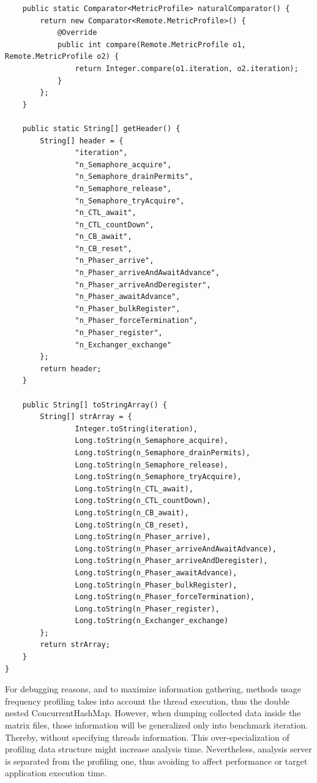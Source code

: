 \documentclass[]{usiinfthesis}
\begin{document}
\begin{verbatim}
    public static Comparator<MetricProfile> naturalComparator() {
        return new Comparator<Remote.MetricProfile>() {
            @Override
            public int compare(Remote.MetricProfile o1, Remote.MetricProfile o2) {
                return Integer.compare(o1.iteration, o2.iteration);
            }
        };
    }

    public static String[] getHeader() {
        String[] header = {
                "iteration",
                "n_Semaphore_acquire",
                "n_Semaphore_drainPermits",
                "n_Semaphore_release",
                "n_Semaphore_tryAcquire",
                "n_CTL_await",
                "n_CTL_countDown",
                "n_CB_await",
                "n_CB_reset",
                "n_Phaser_arrive",
                "n_Phaser_arriveAndAwaitAdvance",
                "n_Phaser_arriveAndDeregister",
                "n_Phaser_awaitAdvance",
                "n_Phaser_bulkRegister",
                "n_Phaser_forceTermination",
                "n_Phaser_register",
                "n_Exchanger_exchange"
        };
        return header;
    }

    public String[] toStringArray() {
        String[] strArray = {
                Integer.toString(iteration),
                Long.toString(n_Semaphore_acquire),
                Long.toString(n_Semaphore_drainPermits),
                Long.toString(n_Semaphore_release),
                Long.toString(n_Semaphore_tryAcquire),
                Long.toString(n_CTL_await),
                Long.toString(n_CTL_countDown),
                Long.toString(n_CB_await),
                Long.toString(n_CB_reset),
                Long.toString(n_Phaser_arrive),
                Long.toString(n_Phaser_arriveAndAwaitAdvance),
                Long.toString(n_Phaser_arriveAndDeregister),
                Long.toString(n_Phaser_awaitAdvance),
                Long.toString(n_Phaser_bulkRegister),
                Long.toString(n_Phaser_forceTermination),
                Long.toString(n_Phaser_register),
                Long.toString(n_Exchanger_exchange)
        };
        return strArray;
    }
}
    \end{verbatim}
    \vspace*{0.25cm}
    For debugging reasons, and to maximize information gathering, methods usage frequency profiling takes into account the thread execution, thus the double nested ConcurrentHashMap. However, when dumping collected data inside the matrix files, those information will be generalized only into benchmark iteration. Thereby, without specifying threads information. This over-specialization of profiling data structure might increase analysis time. Nevertheless, analysis server is separated from the profiling one, thus avoiding to affect performance or target application execution time. 
\end{document}

